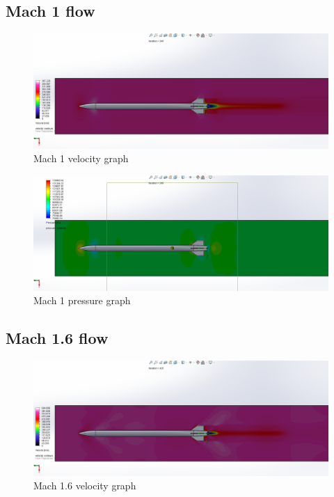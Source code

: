 \documentclass{article}
\begin{document}
\subsection{Mach 1 flow}
\begin{figure}[H]
\centering
\includegraphics[width=\textwidth]{Final10Speed}
\caption{Mach 1 velocity graph}
\label{fig:Final10Speed}
\end{figure}

\begin{figure}[H]
\centering
\includegraphics[width=\textwidth]{Final10Pressure}
\caption{Mach 1 pressure graph}
\label{fig:Final10Pressure}
\end{figure}

\subsection{Mach 1.6 flow}
\begin{figure}[H]
\centering
\includegraphics[width=\textwidth]{Final16Speed}
\caption{Mach 1.6 velocity graph}
\label{fig:Final16Speed}
\end{figure}
\end{document}
